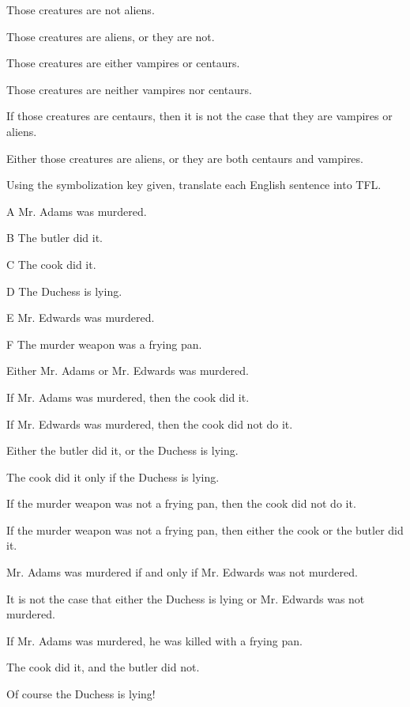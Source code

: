 \begin{earg}
\item Those creatures are not aliens.
\item Those creatures are aliens, or they are not.
\item Those creatures are either vampires or centaurs.
\item Those creatures are neither vampires nor centaurs.
\item If those creatures are centaurs, then it is not the case that they are vampires or aliens.
\item Either those creatures are aliens, or they are both centaurs and vampires.
\end{earg}

\problempart Using the symbolization key given, translate each English sentence into TFL.
\begin{ekey}
\item[A] Mr. Adams was murdered.
\item[B] The butler did it.
\item[C] The cook did it.
\item[D] The Duchess is lying.
\item[E] Mr. Edwards was murdered.
\item[F] The murder weapon was a frying pan.
\end{ekey}

\begin{earg}
\item Either Mr. Adams or Mr. Edwards was murdered.
\item If Mr. Adams was murdered, then the cook did it.
\item If Mr. Edwards was murdered, then the cook did not do it.
\item Either the butler did it, or the Duchess is lying.
\item The cook did it only if the Duchess is lying. 
\item If the murder weapon was not a frying pan, then the cook did not do it.
\item If the murder weapon was not a frying pan, then either the cook or the butler did it.
\item Mr. Adams was murdered if and only if Mr. Edwards was not murdered.
\item It is not the case that either the Duchess is lying or Mr. Edwards was not murdered.
\item If Mr. Adams was murdered, he was killed with a frying pan.
\item The cook did it, and the butler did not.
\item Of course the Duchess is lying!
\end{earg}

